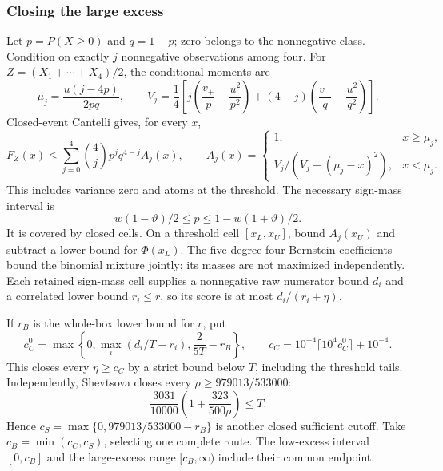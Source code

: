 \subsubsection{Closing the large excess}
Let $p=P(X\ge0)$ and $q=1-p$; zero belongs to the nonnegative class.
Condition on exactly $j$ nonnegative observations among four.
For $Z=(X_1+\cdots+X_4)/2$, the conditional moments are
\[
 \mu_j=\frac{u(j-4p)}{2pq},\qquad
 V_j=\frac14\left[j\left(\frac{v_+}{p}-\frac{u^2}{p^2}\right)
 +(4-j)\left(\frac{v_-}{q}-\frac{u^2}{q^2}\right)\right].
\]
Closed-event Cantelli gives, for every $x$,
\begin{equation}\label{ms:finite:n4all:eq:count-cantelli}
 F_Z(x)\le\sum_{j=0}^4\binom4j p^jq^{4-j}A_j(x),\qquad
 A_j(x)=\begin{cases}1,&x\ge\mu_j,\\
 V_j/(V_j+(\mu_j-x)^2),&x<\mu_j.
 \end{cases}
\end{equation}
This includes variance zero and atoms at the threshold. The necessary
sign-mass interval is
\[
 w(1-\vartheta)/2\le p\le1-w(1+\vartheta)/2.
\]
It is covered by closed cells. On a threshold cell $[x_L,x_U]$,
bound $A_j(x_U)$ and subtract a lower bound for $\Phi(x_L)$.
The five degree-four Bernstein coefficients bound the binomial
mixture jointly; its masses are not maximized independently.
Each retained sign-mass cell supplies a nonnegative raw numerator
bound $d_i$ and a correlated lower bound $r_i\le r$, so its score
is at most $d_i/(r_i+\eta)$.

If $r_B$ is the whole-box lower bound for $r$, put
\[
 c_C^0=\max\left\{0,\max_i(d_i/T-r_i),\frac{2}{5T}-r_B\right\},
 \qquad
 c_C=10^{-4}\lceil10^4c_C^0\rceil+10^{-4}.
\]
This closes every $\eta\ge c_C$ by a strict bound below $T$,
including the threshold tails. Independently, Shevtsova closes
every $\rho\ge979013/533000$:
\[
 \frac{3031}{10000}\left(1+\frac{323}{500\rho}\right)\le T.
\]
Hence $c_S=\max\{0,979013/533000-r_B\}$ is another closed sufficient
cutoff. Take $c_B=\min(c_C,c_S)$, selecting one complete route.
The low-excess interval $[0,c_B]$ and the large-excess range
$[c_B,\infty)$ include their common endpoint.

